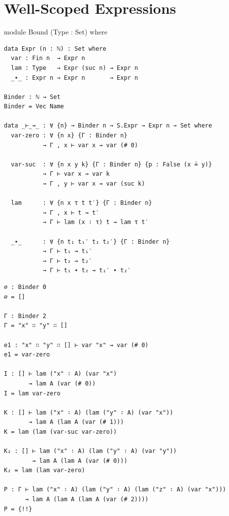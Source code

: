 \documentclass[10pt, xetex, hyperref={pdfpagelabels=false}]{beamer}
\begin{document}
\section{Well-Scoped Expressions}
\begin{frame}[fragile]{module Bound (Type : Set) where}
\begin{verbatim}
data Expr (n : ℕ) : Set where
  var : Fin n  → Expr n
  lam : Type   → Expr (suc n) → Expr n
  _∙_ : Expr n → Expr n       → Expr n

Binder : ℕ → Set
Binder = Vec Name

data _⊢_⇝_ : ∀ {n} → Binder n → S.Expr → Expr n → Set where
  var-zero : ∀ {n x} {Γ : Binder n}
           → Γ , x ⊢ var x ⇝ var (# 0)

  var-suc  : ∀ {n x y k} {Γ : Binder n} {p : False (x ≟ y)}
           → Γ ⊢ var x ⇝ var k
           → Γ , y ⊢ var x ⇝ var (suc k)

  lam      : ∀ {n x τ t t′} {Γ : Binder n}
           → Γ , x ⊢ t ⇝ t′
           → Γ ⊢ lam (x ∶ τ) t ⇝ lam τ t′

  _∙_      : ∀ {n t₁ t₁′ t₂ t₂′} {Γ : Binder n}
           → Γ ⊢ t₁ ⇝ t₁′
           → Γ ⊢ t₂ ⇝ t₂′
           → Γ ⊢ t₁ ∙ t₂ ⇝ t₁′ ∙ t₂′
\end{verbatim}
\end{frame}

\begin{frame}[fragile]
\begin{verbatim}
∅ : Binder 0
∅ = []

Γ : Binder 2
Γ = "x" ∷ "y" ∷ []

e1 : "x" ∷ "y" ∷ [] ⊢ var "x" ⇝ var (# 0)
e1 = var-zero

I : [] ⊢ lam ("x" ∶ A) (var "x")
       ⇝ lam A (var (# 0))
I = lam var-zero

K : [] ⊢ lam ("x" ∶ A) (lam ("y" ∶ A) (var "x"))
       ⇝ lam A (lam A (var (# 1)))
K = lam (lam (var-suc var-zero))

K₂ : [] ⊢ lam ("x" ∶ A) (lam ("y" ∶ A) (var "y"))
        ⇝ lam A (lam A (var (# 0)))
K₂ = lam (lam var-zero)

P : Γ ⊢ lam ("x" ∶ A) (lam ("y" ∶ A) (lam ("z" ∶ A) (var "x")))
      ⇝ lam A (lam A (lam A (var (# 2))))
P = {!!}
\end{verbatim}
\end{frame}
\end{document}
